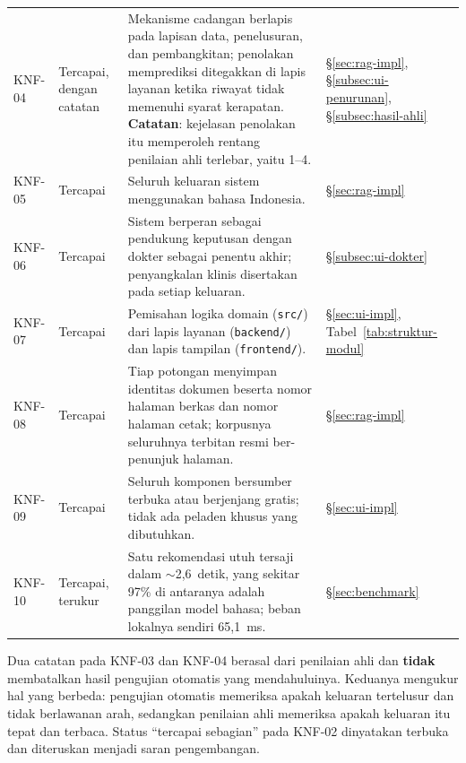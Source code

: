\begin{longtable}{@{}p{1.3cm}>{\raggedright\arraybackslash}p{2.7cm}>{\raggedright\arraybackslash}p{5.4cm}>{\raggedright\arraybackslash}p{2.9cm}@{}}
KNF-04 & Tercapai, dengan catatan & Mekanisme cadangan berlapis pada lapisan data, penelusuran, dan pembangkitan; penolakan memprediksi ditegakkan di lapis layanan ketika riwayat tidak memenuhi syarat kerapatan. \textbf{Catatan}: kejelasan penolakan itu memperoleh rentang penilaian ahli terlebar, yaitu 1--4. & \S\ref{sec:rag-impl}, \S\ref{subsec:ui-penurunan}, \S\ref{subsec:hasil-ahli} \\[2pt]

KNF-05 & Tercapai & Seluruh keluaran sistem menggunakan bahasa Indonesia. & \S\ref{sec:rag-impl} \\[2pt]

KNF-06 & Tercapai & Sistem berperan sebagai pendukung keputusan dengan dokter sebagai penentu akhir; penyangkalan klinis disertakan pada setiap keluaran. & \S\ref{subsec:ui-dokter} \\[2pt]

KNF-07 & Tercapai & Pemisahan logika domain (\texttt{src/}) dari lapis layanan (\texttt{backend/}) dan lapis tampilan (\texttt{frontend/}). & \S\ref{sec:ui-impl}, Tabel~\ref{tab:struktur-modul} \\[2pt]

KNF-08 & Tercapai & Tiap potongan menyimpan identitas dokumen beserta nomor halaman berkas dan nomor halaman cetak; korpusnya seluruhnya terbitan resmi ber-penunjuk halaman. & \S\ref{sec:rag-impl} \\[2pt]

KNF-09 & Tercapai & Seluruh komponen bersumber terbuka atau berjenjang gratis; tidak ada peladen khusus yang dibutuhkan. & \S\ref{sec:ui-impl} \\[2pt]

KNF-10 & Tercapai, terukur & Satu rekomendasi utuh tersaji dalam $\sim$2,6~detik, yang sekitar 97\% di antaranya adalah panggilan model bahasa; beban lokalnya sendiri 65,1~ms. & \S\ref{sec:benchmark} \\

\end{longtable}

\noindent\tabnotestyle Dua catatan pada KNF-03 dan KNF-04 berasal dari penilaian ahli dan \textbf{tidak} membatalkan hasil pengujian otomatis yang mendahuluinya. Keduanya mengukur hal yang berbeda: pengujian otomatis memeriksa apakah keluaran tertelusur dan tidak berlawanan arah, sedangkan penilaian ahli memeriksa apakah keluaran itu tepat dan terbaca. Status ``tercapai sebagian'' pada KNF-02 dinyatakan terbuka dan diteruskan menjadi saran pengembangan.
